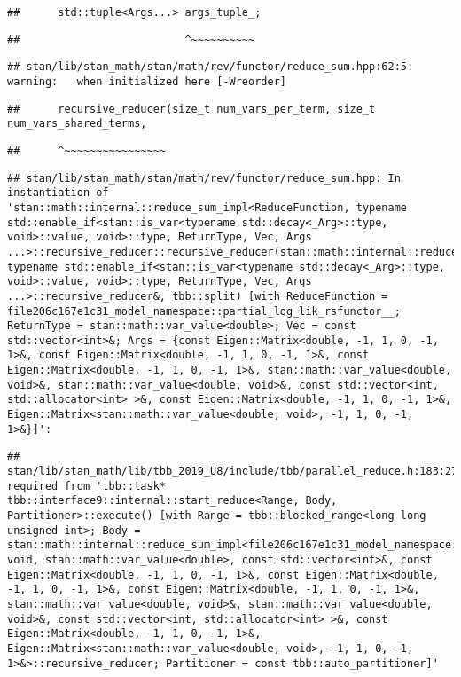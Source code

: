 \documentclass[
]{article}
\begin{document}
\begin{verbatim}
##      std::tuple<Args...> args_tuple_;
\end{verbatim}

\begin{verbatim}
##                          ^~~~~~~~~~~
\end{verbatim}

\begin{verbatim}
## stan/lib/stan_math/stan/math/rev/functor/reduce_sum.hpp:62:5: warning:   when initialized here [-Wreorder]
\end{verbatim}

\begin{verbatim}
##      recursive_reducer(size_t num_vars_per_term, size_t num_vars_shared_terms,
\end{verbatim}

\begin{verbatim}
##      ^~~~~~~~~~~~~~~~~
\end{verbatim}

\begin{verbatim}
## stan/lib/stan_math/stan/math/rev/functor/reduce_sum.hpp: In instantiation of 'stan::math::internal::reduce_sum_impl<ReduceFunction, typename std::enable_if<stan::is_var<typename std::decay<_Arg>::type, void>::value, void>::type, ReturnType, Vec, Args ...>::recursive_reducer::recursive_reducer(stan::math::internal::reduce_sum_impl<ReduceFunction, typename std::enable_if<stan::is_var<typename std::decay<_Arg>::type, void>::value, void>::type, ReturnType, Vec, Args ...>::recursive_reducer&, tbb::split) [with ReduceFunction = file206c167e1c31_model_namespace::partial_log_lik_rsfunctor__; ReturnType = stan::math::var_value<double>; Vec = const std::vector<int>&; Args = {const Eigen::Matrix<double, -1, 1, 0, -1, 1>&, const Eigen::Matrix<double, -1, 1, 0, -1, 1>&, const Eigen::Matrix<double, -1, 1, 0, -1, 1>&, stan::math::var_value<double, void>&, stan::math::var_value<double, void>&, const std::vector<int, std::allocator<int> >&, const Eigen::Matrix<double, -1, 1, 0, -1, 1>&, Eigen::Matrix<stan::math::var_value<double, void>, -1, 1, 0, -1, 1>&}]':
\end{verbatim}

\begin{verbatim}
## stan/lib/stan_math/lib/tbb_2019_U8/include/tbb/parallel_reduce.h:183:27:   required from 'tbb::task* tbb::interface9::internal::start_reduce<Range, Body, Partitioner>::execute() [with Range = tbb::blocked_range<long long unsigned int>; Body = stan::math::internal::reduce_sum_impl<file206c167e1c31_model_namespace::partial_log_lik_rsfunctor__, void, stan::math::var_value<double>, const std::vector<int>&, const Eigen::Matrix<double, -1, 1, 0, -1, 1>&, const Eigen::Matrix<double, -1, 1, 0, -1, 1>&, const Eigen::Matrix<double, -1, 1, 0, -1, 1>&, stan::math::var_value<double, void>&, stan::math::var_value<double, void>&, const std::vector<int, std::allocator<int> >&, const Eigen::Matrix<double, -1, 1, 0, -1, 1>&, Eigen::Matrix<stan::math::var_value<double, void>, -1, 1, 0, -1, 1>&>::recursive_reducer; Partitioner = const tbb::auto_partitioner]'
\end{verbatim}
\end{document}
